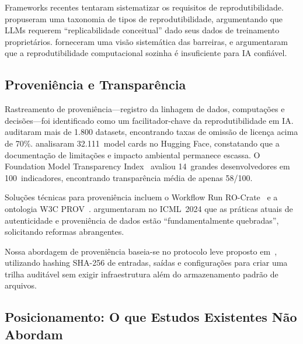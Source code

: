 \documentclass[12pt, a4paper]{article}
\begin{document}
Frameworks recentes tentaram sistematizar os requisitos de reprodutibilidade.
\citet{desai2025reproducibility} propuseram uma taxonomia de tipos de reprodutibilidade, argumentando que LLMs requerem ``replicabilidade conceitual'' dado seus dados de treinamento proprietários.
\citet{semmelrock2025barriers} forneceram uma visão sistemática das barreiras, e \citet{yu2024hdsr} argumentaram que a reprodutibilidade computacional sozinha é insuficiente para IA confiável.

\subsection{Proveniência e Transparência}

Rastreamento de proveniência---registro da linhagem de dados, computações e decisões---foi identificado como um facilitador-chave da reprodutibilidade em IA.
\citet{longpre2024audit} auditaram mais de 1.800 datasets, encontrando taxas de omissão de licença acima de 70\%.
\citet{liang2024modelcards} analisaram 32.111~model cards no Hugging Face, constatando que a documentação de limitações e impacto ambiental permanece escassa.
O Foundation Model Transparency Index~\citep{bommasani2024fmti} avaliou 14~grandes desenvolvedores em 100~indicadores, encontrando transparência média de apenas 58/100.

Soluções técnicas para proveniência incluem o Workflow Run RO-Crate~\citep{leo2024rocrate} e a ontologia W3C PROV~\citep{kale2023provenance}.
\citet{longpre2024broken} argumentaram no ICML~2024 que as práticas atuais de autenticidade e proveniência de dados estão ``fundamentalmente quebradas'', solicitando reformas abrangentes.

Nossa abordagem de proveniência baseia-se no protocolo leve proposto em~\citet{rover2026jair}, utilizando hashing SHA-256 de entradas, saídas e configurações para criar uma trilha auditável sem exigir infraestrutura além do armazenamento padrão de arquivos.

\subsection{Posicionamento: O que Estudos Existentes Não Abordam}
\end{document}
